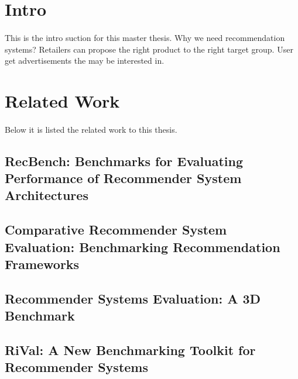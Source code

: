 \section{Intro}
\paragraph{} This is the intro suction for this master thesis.
Why we need recommendation systems? Retailers can propose the right product to the right target group.
User get advertisements the may be interested in.\cite{RecommenderSystems:2}


\section{Related Work}
\paragraph{} Below it is listed the related work to this thesis.

\subsection{RecBench: Benchmarks for Evaluating Performance of Recommender System Architectures}
\subsection{Comparative Recommender System Evaluation: Benchmarking Recommendation Frameworks}
\subsection{Recommender Systems Evaluation: A 3D Benchmark}
\subsection{RiVal: A New Benchmarking Toolkit for Recommender Systems}